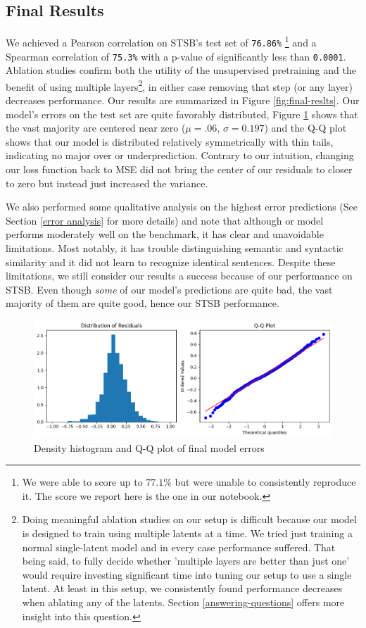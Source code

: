 \documentclass{article}
\begin{document}
\subsection{Final Results}
We achieved a Pearson correlation on STSB's test set of \verb|76.86%| \footnote{We were able to score up to $77.1\%$ but were unable to consistently reproduce it. The score we report here is the one in our notebook.} and a Spearman correlation of \verb|75.3%| with a p-value of significantly less than \verb|0.0001|. Ablation studies confirm both the utility of the unsupervised pretraining and the benefit of using multiple layers\footnote{Doing meaningful ablation studies on our setup is difficult because our model is designed to train using multiple latents at a time. We tried just training a normal single-latent model and in every case performance suffered. That being said, to fully decide whether 'multiple layers are better than just one' would require investing significant time into tuning our setup to use a single latent. At least in this setup, we consistently found performance decreases when ablating any of the latents. Section \ref{answering-questions} offers more insight into this question.}, in either case removing that step (or any layer) decreases performance. Our results are summarized in Figure \ref{fig:final-reslts}. Our model's errors on the test set are quite favorably distributed, Figure \ref{fig:residuals} shows that the vast majority are centered near zero ($\mu = .06$, $\sigma = 0.197$) and the Q-Q plot shows that our model is distributed relatively symmetrically with thin tails, indicating no major over or underprediction. Contrary to our intuition, changing our loss function back to MSE did not bring the center of our residuals to closer to zero but instead just increased the variance.

We also performed some qualitative analysis on the highest error predictions (See Section \ref{error analysis} for more details) and note that although or model performs moderately well on the benchmark, it has clear and unavoidable limitations. Most notably, it has trouble distinguishing semantic and syntactic similarity and it did not learn to recognize identical sentences. Despite these limitations, we still consider our results a success because of our performance on STSB. Even though \textit{some} of our model's predictions are quite bad, the vast majority of them are quite good, hence our STSB performance.


\begin{figure}[!htb]
    \centering
    \includegraphics[width=.90\linewidth]{residuals.png}
    \caption{Density histogram and Q-Q plot of final model errors}
    \label{fig:residuals}
\end{figure}    
\end{document}
